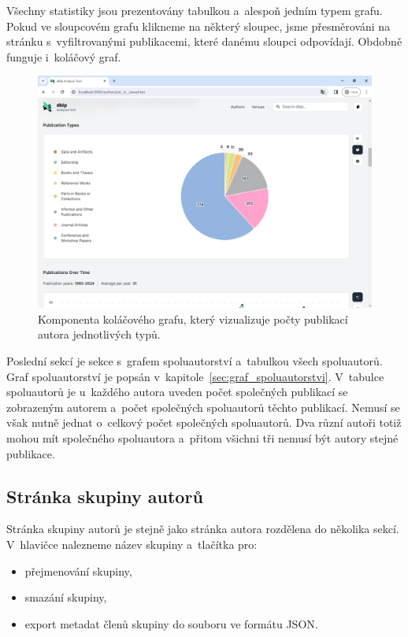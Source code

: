 \documentclass[
  biblatex,
  sourcecodes,
  glossaries,
  index
]{kidiplom}
\begin{document}
Všechny statistiky jsou prezentovány tabulkou a~alespoň jedním typem grafu. Pokud ve sloupcovém grafu klikneme na některý sloupec, jsme přesměrováni na stránku s~vyfiltrovanými publikacemi, které danému sloupci odpovídají. Obdobně funguje i~koláčový graf.

\begin{figure}[H]
\begin{center}
\includegraphics[width=\textwidth]{stranka_autora_kolac}
\caption{Komponenta koláčového grafu, který vizualizuje počty publikací autora jednotlivých typů.}\label{fig:stranka_autora_kolac}
\end{center}
\end{figure}

Poslední sekcí je sekce s~grafem spoluautorství a~tabulkou všech spoluautorů. Graf spoluautorství je popsán v~kapitole~\ref{sec:graf_spoluautorstvi}. V~tabulce spoluautorů je u~každého autora uveden počet společných publikací se zobrazeným autorem a~počet společných spoluautorů těchto publikací. Nemusí se však nutně jednat o~celkový počet společných spoluautorů. Dva různí autoři totiž mohou mít společného spoluautora a~přitom všichni tři nemusí být autory stejné publikace.

\subsection{Stránka skupiny autorů}

Stránka skupiny autorů je stejně jako stránka autora rozdělena do několika sekcí. V~hlavičce nalezneme název skupiny a~tlačítka pro: 
\begin{itemize}
\item přejmenování skupiny,
\item smazání skupiny,
\item export metadat členů skupiny do souboru ve formátu JSON.
\end{itemize}
\end{document}
